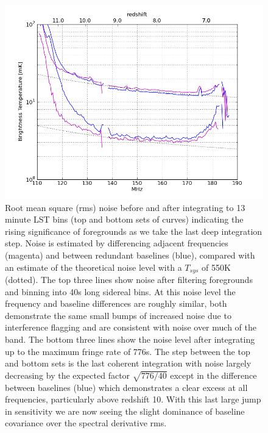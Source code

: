 \documentclass[preprint2]{aastex}
\begin{document}
\begin{figure}
\centering
\includegraphics[width=\columnwidth]{figures/psa32_trms_with_and_without_fr_filtering_z.png}
\caption{\label{fig:noise} Root mean square (rms) noise before and after integrating to 13 minute LST bins (top and bottom sets of curves) indicating the rising significance of foregrounds as we take the last deep integration step. Noise is estimated by differencing adjacent frequencies (magenta) and between redundant baselines (blue), compared with an estimate of the theoretical noise level with a $T_{sys}$ of 550K (dotted). The top three lines show noise after filtering foregrounds and binning into 40s long sidereal bins.  At this noise level the frequency and baseline differences are roughly similar, both demonstrate the same small bumps of increased noise due to interference flagging and are consistent with noise over much of the band.  The bottom three lines show the noise level after integrating up to the maximum fringe rate of 776s. The step between the top and bottom sets is the last coherent integration with noise largely decreasing by the expected factor $\sqrt{776/40}$ except in the difference between baselines (blue) which demonstrates a clear excess at all frequencies, particularly above redshift 10. With this last large jump in sensitivity we are now seeing the slight dominance of baseline covariance over the spectral derivative rms. }
\end{figure}
\end{document}
